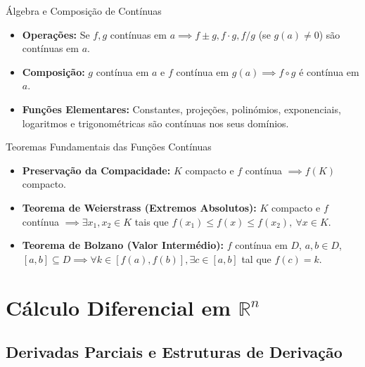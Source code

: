 \documentclass[11pt,a4paper]{article}
\newcommand{\R}{\mathbb{R}}
\begin{document}
\noindent\begin{theorembox}{Álgebra e Composição de Contínuas}
  \begin{itemize}
    \item \textbf{Operações:} Se $f, g$ contínuas em $a \implies f \pm g, f \cdot g, f/g$ (se $g(a) \neq 0$) são contínuas em $a$.
    \item \textbf{Composição:} $g$ contínua em $a$ e $f$ contínua em $g(a) \implies f \circ g$ é contínua em $a$.
    \item \textbf{Funções Elementares:} Constantes, projeções, polinómios, exponenciais, logaritmos e trigonométricas são contínuas nos seus domínios.
  \end{itemize}
\end{theorembox}

\noindent\begin{theorembox}{Teoremas Fundamentais das Funções Contínuas}
  \begin{itemize}
    \item \textbf{Preservação da Compacidade:} $K$ compacto e $f$ contínua $\implies f(K)$ compacto.
    \item \textbf{Teorema de Weierstrass (Extremos Absolutos):} $K$ compacto e $f$ contínua $\implies \exists x_1, x_2 \in K$ tais que $f(x_1) \leq f(x) \leq f(x_2), \ \forall x \in K$.
    \item \textbf{Teorema de Bolzano (Valor Intermédio):} $f$ contínua em $D$, $a, b \in D$, $[a, b] \subseteq D \implies \forall k \in [f(a), f(b)], \exists c \in [a, b]$ tal que $f(c) = k$.
  \end{itemize}
\end{theorembox}

\newpage

\section{Cálculo Diferencial em \texorpdfstring{$\R^n$}{R\textasciicircum n}}
\label{chap:calculo_diferencial}

\subsection{Derivadas Parciais e Estruturas de Derivação}
\end{document}
